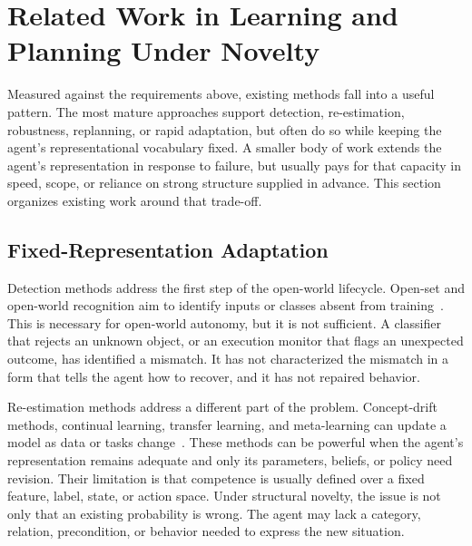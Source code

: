 
\section{Related Work in Learning and Planning Under Novelty}
\label{sec:what_field_does}
\label{sec:capabilities_and_gaps}

Measured against the requirements above, existing methods fall into a useful pattern.
The most mature approaches support detection, re-estimation, robustness, replanning, or rapid adaptation, but often do so while keeping the agent's representational vocabulary fixed.
A smaller body of work extends the agent's representation in response to failure, but usually pays for that capacity in speed, scope, or reliance on strong structure supplied in advance.
This section organizes existing work around that trade-off.

\subsection{Fixed-Representation Adaptation}
\label{sec:fixed_representation_methods}

Detection methods address the first step of the open-world lifecycle.
Open-set and open-world recognition aim to identify inputs or classes absent from training~\citep{boult2021towards}.
This is necessary for open-world autonomy, but it is not sufficient.
A classifier that rejects an unknown object, or an execution monitor that flags an unexpected outcome, has identified a mismatch.
It has not characterized the mismatch in a form that tells the agent how to recover, and it has not repaired behavior.

Re-estimation methods address a different part of the problem.
Concept-drift methods, continual learning, transfer learning, and meta-learning can update a model as data or tasks change~\citep{gama2014survey,parisi2019continual,taylor2009transfer,finn2017maml,khetarpal2022continual}.
These methods can be powerful when the agent's representation remains adequate and only its parameters, beliefs, or policy need revision.
Their limitation is that competence is usually defined over a fixed feature, label, state, or action space.
Under structural novelty, the issue is not only that an existing probability is wrong.
The agent may lack a category, relation, precondition, or behavior needed to express the new situation.

